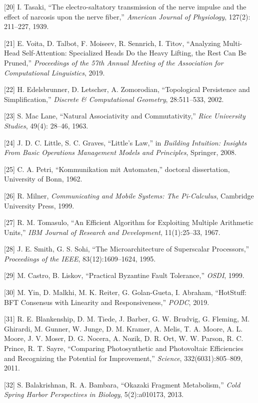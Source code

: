 \documentclass[
  11pt,
]{article}
\begin{document}
{[}20{]} I. Tasaki, ``The electro-saltatory transmission of the nerve
impulse and the effect of narcosis upon the nerve fiber,''
\emph{American Journal of Physiology}, 127(2): 211--227, 1939.

{[}21{]} E. Voita, D. Talbot, F. Moiseev, R. Sennrich, I. Titov,
``Analyzing Multi-Head Self-Attention: Specialized Heads Do the Heavy
Lifting, the Rest Can Be Pruned,'' \emph{Proceedings of the 57th Annual
Meeting of the Association for Computational Linguistics}, 2019.

{[}22{]} H. Edelsbrunner, D. Letscher, A. Zomorodian, ``Topological
Persistence and Simplification,'' \emph{Discrete \& Computational
Geometry}, 28:511--533, 2002.

{[}23{]} S. Mac Lane, ``Natural Associativity and Commutativity,''
\emph{Rice University Studies}, 49(4): 28--46, 1963.

{[}24{]} J. D. C. Little, S. C. Graves, ``Little's Law,'' in
\emph{Building Intuition: Insights From Basic Operations Management
Models and Principles}, Springer, 2008.

{[}25{]} C. A. Petri, ``Kommunikation mit Automaten,'' doctoral
dissertation, University of Bonn, 1962.

{[}26{]} R. Milner, \emph{Communicating and Mobile Systems: The
Pi-Calculus}, Cambridge University Press, 1999.

{[}27{]} R. M. Tomasulo, ``An Efficient Algorithm for Exploiting
Multiple Arithmetic Units,'' \emph{IBM Journal of Research and
Development}, 11(1):25--33, 1967.

{[}28{]} J. E. Smith, G. S. Sohi, ``The Microarchitecture of Superscalar
Processors,'' \emph{Proceedings of the IEEE}, 83(12):1609--1624, 1995.

{[}29{]} M. Castro, B. Liskov, ``Practical Byzantine Fault Tolerance,''
\emph{OSDI}, 1999.

{[}30{]} M. Yin, D. Malkhi, M. K. Reiter, G. Golan-Gueta, I. Abraham,
``HotStuff: BFT Consensus with Linearity and Responsiveness,''
\emph{PODC}, 2019.

{[}31{]} R. E. Blankenship, D. M. Tiede, J. Barber, G. W. Brudvig, G.
Fleming, M. Ghirardi, M. Gunner, W. Junge, D. M. Kramer, A. Melis, T. A.
Moore, A. L. Moore, J. V. Moser, D. G. Nocera, A. Nozik, D. R. Ort, W.
W. Parson, R. C. Prince, R. T. Sayre, ``Comparing Photosynthetic and
Photovoltaic Efficiencies and Recognizing the Potential for
Improvement,'' \emph{Science}, 332(6031):805--809, 2011.

{[}32{]} S. Balakrishnan, R. A. Bambara, ``Okazaki Fragment
Metabolism,'' \emph{Cold Spring Harbor Perspectives in Biology},
5(2):a010173, 2013.
\end{document}
